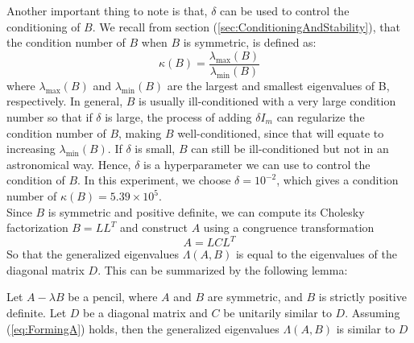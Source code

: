 Another important thing to note is that, $\delta$ can be used to control the conditioning of $B$. We recall from section (\ref{sec:ConditioningAndStability}), that the condition number of $B$ when $B$ is symmetric, is defined as:
\begin{equation}
	\kappa(B) = \frac{\lambda_{\max}(B)}{\lambda_{\min}(B)}
\end{equation}
where $\lambda_{\max}(B)$ and $\lambda_{\min}(B)$ are the largest and smallest eigenvalues of B, respectively.
In general, $B$ is usually ill-conditioned with a very large condition number so that if $\delta$ is large, the process of adding $\delta I_m$ can regularize the condition number of $B$, making $B$ well-conditioned, since that will equate to increasing $\lambda_{\min}(B)$. If $\delta$ is small, $B$ can still be ill-conditioned but not in an astronomical way. Hence, $\delta$ is a hyperparameter we can use to control the condition of $B$. In this experiment, we choose $\delta = 10^{-2}$, which gives a condition number of $\kappa(B) = 5.39 \times 10^5$.\\
Since $B$ is symmetric and positive definite, we can compute its Cholesky factorization $B = LL^T$ and construct $A$ using a congruence transformation
\begin{equation}\label{eq:FormingA}
	A = LCL^T
\end{equation}
So that the generalized eigenvalues $\Lambda(A, B)$ is equal to the eigenvalues of the diagonal matrix $D$. This can be summarized by the following lemma:
\begin{lemma}
	Let $A-\lambda B$ be a pencil, where $A$ and $B$ are symmetric, and $B$ is strictly positive definite. Let $D$ be a diagonal matrix and $C$ be unitarily similar to $D$. Assuming (\ref{eq:FormingA}) holds, then the generalized eigenvalues $\Lambda(A, B)$ is similar to $D$
\end{lemma}

